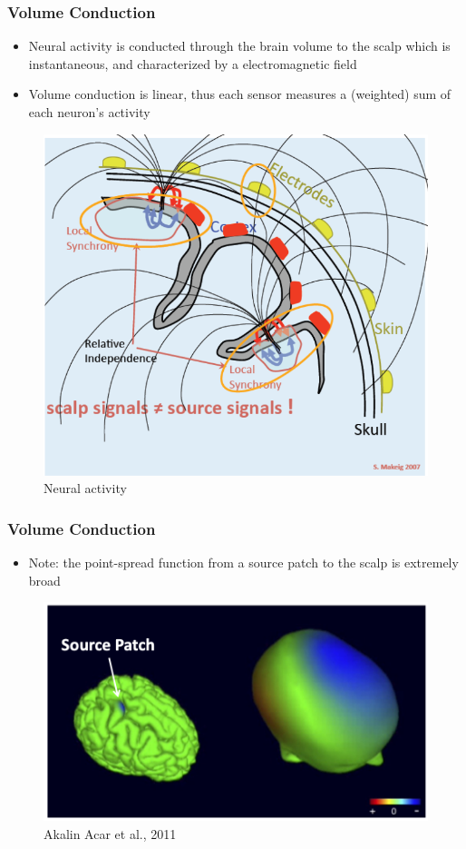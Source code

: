 \documentclass{beamer}
\begin{document}
\begin{frame}
\frametitle{Volume Conduction}
\begin{itemize}
	\item Neural activity is conducted through the brain volume to the scalp which is instantaneous, and characterized by a electromagnetic field
	\item Volume conduction is linear, thus each sensor measures a (weighted) sum of each neuron's activity
\end{itemize}
	\begin{figure}
		\includegraphics[width=0.4\linewidth]{image/firing}
		\caption{Neural activity}
	\end{figure}
\end{frame}

\begin{frame}
\frametitle{Volume Conduction}
\begin{itemize}
	\item Note: the point-spread function from a source patch to the scalp is extremely broad
\end{itemize}
	\begin{figure}
		\includegraphics[width=0.7\linewidth]{image/source}
		\caption{Akalin Acar et al., 2011}
	\end{figure}
\end{frame}
\end{document}
